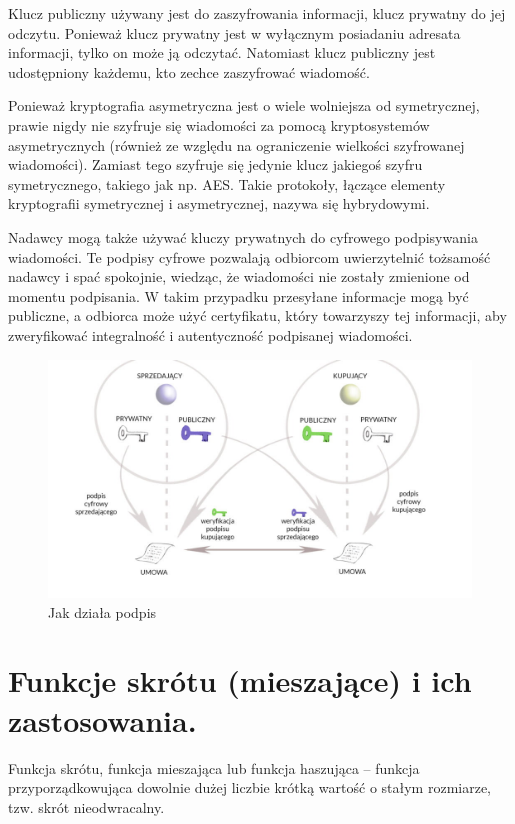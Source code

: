 \documentclass[a4paper,12pt,oneside]{book}
\begin{document}
			Klucz publiczny używany jest do zaszyfrowania informacji, klucz prywatny do jej odczytu. Ponieważ klucz prywatny jest w wyłącznym posiadaniu adresata informacji, tylko on może ją odczytać. Natomiast klucz publiczny jest udostępniony każdemu, kto zechce zaszyfrować wiadomość.
			
			Ponieważ kryptografia asymetryczna jest o wiele wolniejsza od symetrycznej, prawie nigdy nie szyfruje się wiadomości za pomocą kryptosystemów asymetrycznych (również ze względu na ograniczenie wielkości szyfrowanej wiadomości). Zamiast tego szyfruje się jedynie klucz jakiegoś szyfru symetrycznego, takiego jak np. AES. Takie protokoły, łączące elementy kryptografii symetrycznej i asymetrycznej, nazywa się hybrydowymi.
			
			Nadawcy mogą także używać kluczy prywatnych do cyfrowego podpisywania wiadomości. Te podpisy cyfrowe pozwalają odbiorcom uwierzytelnić tożsamość nadawcy i spać spokojnie, wiedząc, że wiadomości nie zostały zmienione od momentu podpisania. W takim przypadku przesyłane informacje mogą być publiczne, a odbiorca może użyć certyfikatu, który towarzyszy tej informacji, aby zweryfikować integralność i autentyczność podpisanej wiadomości.
			
			\begin{figure}[h]
				\centering\includegraphics[scale=0.35]{krypt_asym_podpis.png}
				\caption{Jak działa podpis}
			\end{figure}
		
		\setcounter{section}{1}
		\section{Funkcje skrótu (mieszające) i ich zastosowania. }
			Funkcja skrótu, funkcja mieszająca lub funkcja haszująca – funkcja przyporządkowująca dowolnie dużej liczbie krótką wartość o stałym rozmiarze, tzw. skrót nieodwracalny.\\
			
\end{document}
